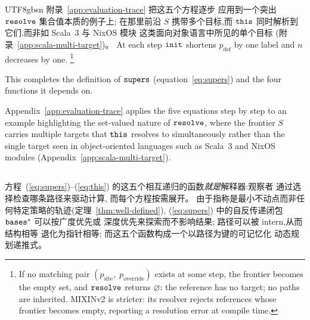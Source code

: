 \begin{CJK*}{UTF8}{gbsn}
附录~\ref{app:evaluation-trace} 把这五个方程逐步
应用到一个突出 $\mathtt{resolve}$ 集合值本质的例子上;
在那里前沿 $S$ 携带多个目标,而
$\mathtt{this}$ 同时解析到它们,而非如 Scala~3 与 NixOS 模块
这类面向对象语言中所见的单个目标
(附录~\ref{app:scala-multi-target})。
\else
At each step $\mathtt{init}$ shortens $p_{\mathrm{def}}$ by one label
and $n$ decreases by one.%
\footnote{
  If no matching pair
  $(p_{\mathrm{site}},\; p_{\mathrm{override}})$ exists
  at some step, the frontier becomes the empty set, and
  $\mathtt{resolve}$ returns $\varnothing$: the reference has no
  target; no paths are inherited.
  MIXINv2 is stricter: its resolver rejects
  references whose frontier becomes empty, reporting a
  resolution error at compile time.
}

This completes the definition of $\mathtt{supers}$ (equation~\ref{eq:supers}) and the four functions it depends on.

Appendix~\ref{app:evaluation-trace} applies the five equations step by
step to an example highlighting the set-valued nature of $\mathtt{resolve}$,
where the frontier $S$ carries multiple targets that
$\mathtt{this}$ resolves to simultaneously rather than the single target
seen in object-oriented languages such as Scala~3 and NixOS modules
(Appendix~\ref{app:scala-multi-target}).
\fi

\subsection{}
\ifPaperChinese
方程~(\ref{eq:supers})--(\ref{eq:this}) 的这五个相互递归的函数\emph{就是}解释器:观察者
通过选择检查哪条路径来驱动计算,
而每个方程按需展开。
由于指称是最小不动点而非任何特定策略的轨迹(定理~\ref{thm:well-defined}),
(\ref{eq:supers}) 中的自反传递闭包 $\mathtt{bases}^*$
可以按广度优先或
深度优先来探索而不影响结果;
路径可以被 intern,从而结构相等
退化为指针相等;
而这五个函数构成一个以路径为键的可记忆化
动态规划递推式。


\end{CJK*}
